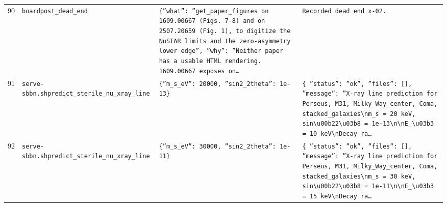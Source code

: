\documentclass[11pt,a4paper]{article}
\begin{document}
\begin{longtable}{@{}p{}p{}p{}p{}@{}}
90 & \texttt{board}\newline\texttt{post\_\allowbreak{}dead\_\allowbreak{}end} & \texttt{\{''what'':\allowbreak{} ''get\_\allowbreak{}paper\_\allowbreak{}figures on 1609.00667 (Figs. 7-8)\allowbreak{} and on 2507.20659 (Fig. 1)\allowbreak{},\allowbreak{} to digitize the NuSTAR limits and the zero-asymmetry lower edge'',\allowbreak{} ''why'':\allowbreak{} ''Neither paper has a usable HTML rendering. 1609.00667 exposes on\ldots{}\allowbreak{}} & \texttt{Recorded dead end x-02.} \\
91 & \texttt{serve-sbbn.sh}\newline\texttt{predict\_\allowbreak{}sterile\_\allowbreak{}nu\_\allowbreak{}xray\_\allowbreak{}line} & \texttt{\{''m\_\allowbreak{}s\_\allowbreak{}eV'':\allowbreak{} 20000,\allowbreak{} ''sin2\_\allowbreak{}2theta'':\allowbreak{} 1e-13\}\allowbreak{}} & \texttt{\{   ''status'':\allowbreak{} ''ok'',\allowbreak{}   ''files'':\allowbreak{} []\allowbreak{},\allowbreak{}   ''message'':\allowbreak{} ''X-ray line prediction for Perseus,\allowbreak{} M31,\allowbreak{} Milky\_\allowbreak{}Way\_\allowbreak{}center,\allowbreak{} Coma,\allowbreak{} stacked\_\allowbreak{}galaxies\textbackslash{}\allowbreak{}nm\_\allowbreak{}s =\allowbreak{} 20 keV,\allowbreak{} sin\textbackslash{}\allowbreak{}u00b22\textbackslash{}\allowbreak{}u03b8 =\allowbreak{} 1e-13\textbackslash{}\allowbreak{}n\textbackslash{}\allowbreak{}nE\_\allowbreak{}\textbackslash{}\allowbreak{}u03b3 =\allowbreak{} 10 keV\textbackslash{}\allowbreak{}nDecay ra\ldots{}\allowbreak{}} \\
92 & \texttt{serve-sbbn.sh}\newline\texttt{predict\_\allowbreak{}sterile\_\allowbreak{}nu\_\allowbreak{}xray\_\allowbreak{}line} & \texttt{\{''m\_\allowbreak{}s\_\allowbreak{}eV'':\allowbreak{} 30000,\allowbreak{} ''sin2\_\allowbreak{}2theta'':\allowbreak{} 1e-11\}\allowbreak{}} & \texttt{\{   ''status'':\allowbreak{} ''ok'',\allowbreak{}   ''files'':\allowbreak{} []\allowbreak{},\allowbreak{}   ''message'':\allowbreak{} ''X-ray line prediction for Perseus,\allowbreak{} M31,\allowbreak{} Milky\_\allowbreak{}Way\_\allowbreak{}center,\allowbreak{} Coma,\allowbreak{} stacked\_\allowbreak{}galaxies\textbackslash{}\allowbreak{}nm\_\allowbreak{}s =\allowbreak{} 30 keV,\allowbreak{} sin\textbackslash{}\allowbreak{}u00b22\textbackslash{}\allowbreak{}u03b8 =\allowbreak{} 1e-11\textbackslash{}\allowbreak{}n\textbackslash{}\allowbreak{}nE\_\allowbreak{}\textbackslash{}\allowbreak{}u03b3 =\allowbreak{} 15 keV\textbackslash{}\allowbreak{}nDecay ra\ldots{}\allowbreak{}} \\

\end{longtable}
\end{document}
